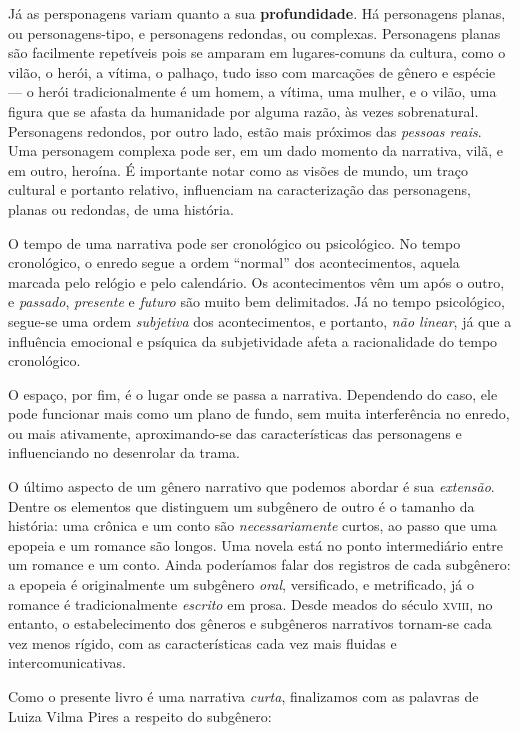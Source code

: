 \documentclass[11pt]{extarticle}
\begin{document}
Já as persponagens variam quanto a sua \textbf{profundidade}. Há personagens planas, ou
personagens-tipo, e personagens redondas, ou complexas. Personagens planas
são facilmente repetíveis pois se amparam em lugares-comuns da cultura, como
o vilão, o herói, a vítima, o palhaço, tudo isso com marcações de gênero e espécie ---
o herói tradicionalmente é um homem, a vítima, uma mulher, e o vilão, uma figura que 
se afasta da humanidade por alguma razão, às vezes sobrenatural. 
Personagens redondos, por outro lado, estão mais próximos das \textit{pessoas reais}.
Uma personagem complexa pode ser, em um dado momento da narrativa, vilã, e em 
outro, heroína. É importante notar como as visões de mundo, um traço cultural e 
portanto relativo, influenciam na caracterização das personagens, planas 
ou redondas, de uma história.

O tempo de uma narrativa pode ser cronológico ou psicológico.
No tempo cronológico, o enredo segue a ordem ``normal'' dos acontecimentos,
aquela marcada pelo relógio e pelo calendário. Os acontecimentos vêm um após o 
outro, e \textit{passado}, \textit{presente} e \textit{futuro} são muito bem delimitados.
Já no tempo psicológico, segue-se uma ordem \textit{subjetiva} dos acontecimentos, 
e portanto, \textit{não linear}, já que a influência emocional e psíquica 
da subjetividade afeta a racionalidade do tempo cronológico. 

O espaço, por fim, é o lugar onde se passa a narrativa. Dependendo do caso, 
ele pode funcionar mais como um plano de fundo, sem muita interferência
no enredo, ou mais ativamente, aproximando-se das características das personagens
e influenciando no desenrolar da trama. 

O último aspecto de um gênero narrativo que podemos abordar é sua 
\textit{extensão}. Dentre os elementos que distinguem um subgênero 
de outro é o tamanho da história: uma crônica e um conto são \textit{necessariamente}
curtos, ao passo que uma epopeia e um romance são longos. Uma novela
está no ponto intermediário entre um romance e um conto.
Ainda poderíamos falar dos registros de cada subgênero: 
a epopeia é originalmente um subgênero \textit{oral}, versificado, e metrificado,
já o romance é tradicionalmente \textit{escrito} em prosa. 
Desde meados do século \textsc{xviii}, no entanto, o estabelecimento
dos gêneros e subgêneros narrativos tornam-se cada vez menos rígido,
com as características cada vez mais fluidas e intercomunicativas.

Como o presente livro é uma narrativa \textit{curta},
finalizamos com as palavras de Luiza Vilma Pires a respeito do
subgênero:
\end{document}
